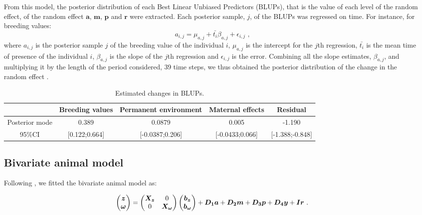 From this model, the posterior distribution of each Best Linear Unbiased Predictors (BLUPs), that is the value of each level of the random effect, of the random effect $\boldsymbol{a}$, $\boldsymbol{m}$, $\boldsymbol{p}$ and $\boldsymbol{r}$ were extracted. 
Each posterior sample, $j$, of the BLUPs was regressed on time. For instance, for breeding values:
\begin{equation}
a_{i,j} = \mu_{a,j} + \bar{t_i} \beta_{a,j} + \epsilon_{i,j} \text{ ,}
\end{equation}
where $a_{i,j}$ is the posterior sample $j$ of the breeding value of the individual $i$, $\mu_{a,j}$ is the intercept for the $j$th regression, $\bar{t_i}$ is the mean time of presence of the individual $i$,  $\beta_{a,j}$ is the slope of the $j$th regression and  $\epsilon_{i,j}$ is the error. 
Combining all the slope estimates, $\beta_{a,j}$, and multiplying it by the length of the period considered, 39 time steps, we thus obtained the posterior distribution of the change in the random effect \citep{Hadfield2010}.

\begin{table}[H]
\caption{Estimated changes in BLUPs.}
\label{table:UnivariateAM}
\begin{tabular}{c c c c c}
\hline
				&	Breeding values & Permanent environment & Maternal effects & Residual \\
                \hline
Posterior mode 	& 0.389     &    0.0879 & 0.005 &     -1.190\\
95\%CI 			& [0.122;0.664]			&[-0.0387;0.206]		& [-0.0433;0.066]	& [-1.388;-0.848]\\
\hline
\end{tabular}
\end{table}

\subsection{Bivariate animal model}
Following \cite{Morrissey2012}, we fitted the bivariate animal model as:

\begin{equation}
\begin{pmatrix}
\boldsymbol{z}\\
\boldsymbol{\omega}\\
\end{pmatrix}
=\begin{pmatrix}
\boldsymbol{X_z}	& 0\\
0	&	\boldsymbol{X_{\omega}}\\
\end{pmatrix}
\begin{pmatrix}
\boldsymbol{b_z}\\
\boldsymbol{b_{\omega}}\\
\end{pmatrix}+\boldsymbol{D_1a}+\boldsymbol{D_2m}+\boldsymbol{D_3p}+\boldsymbol{D_4y}+\boldsymbol{Ir} \text{ .}\\
\end{equation}

